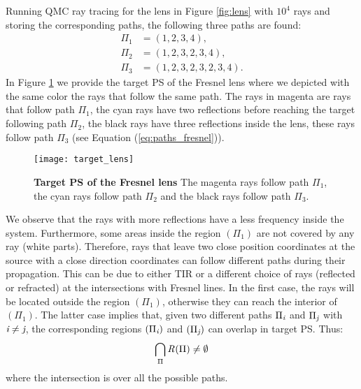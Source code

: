 Running QMC ray tracing for the lens in Figure \ref{fig:lens} with $10^4$ rays and storing the corresponding paths, the following three paths are found:
\begin{equation}\label{eq:paths_fresnel}
\begin{aligned}
\Pi_1 & = (1,2,3,4),\\
\Pi_2 & = (1,2,3,2,3,4), \\
\Pi_3 & = (1,2,3,2,3,2,3,4).
\end{aligned}
\end{equation}
In Figure \ref{fig:target_PS_lens} we provide the target PS of the Fresnel lens where we depicted with the same color the rays that follow the same path. The rays in magenta are rays that follow path $\Pi_1$, the cyan rays have two reflections before reaching the target following path $\Pi_2$, the black rays have three reflections inside the lens, these rays follow path $\Pi_3$ (see Equation (\ref{eq:paths_fresnel})).
\begin{figure}[t]
  \begin{center}
  \texttt{[image: target\_lens]}
  \end{center}
  \caption{\textbf{Target PS of the Fresnel lens}
The magenta rays follow path $\Pi_1$, the cyan rays follow path $\Pi_2$ and the black rays follow path $\Pi_3$.}
\label{fig:target_PS_lens}
 \end{figure}
We observe that the rays with more reflections have a less frequency inside the system. Furthermore, some areas inside the region $(\Pi_1)$ are not covered by any ray (white parts). Therefore, rays that leave two close position coordinates at the source with a close direction coordinates can follow different paths during their propagation. This can be due to either TIR or a different choice of rays (reflected or refracted) at the intersections with Fresnel lines. In the first case, the rays will be located outside the region $(\Pi_1)$, otherwise they can reach the interior of $(\Pi_1)$. The latter case implies that, given two different paths $\Pi_{\textit{i}}$ and $\Pi_{\textit{j}}$ with $\textit{i}\neq\textit{j}$, the corresponding regions $(\Pi_{\textit{i}})$ and $(\Pi_{\textit{j}})$ can overlap in target PS. Thus:
\begin{equation}
\bigcap_{\Pi}\mbox{$\emph{R}_{\textit{}}$}(\Pi)\neq \emptyset
\end{equation}
where the intersection is over all the possible paths. 
